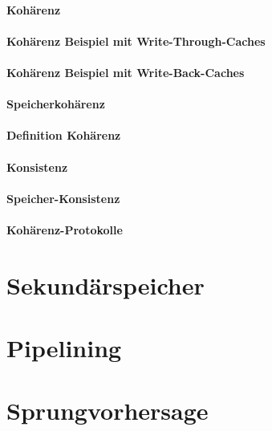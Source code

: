 \subsubsection{Kohärenz}
\subsubsection*{Kohärenz Beispiel mit Write-Through-Caches}
\subsubsection*{Kohärenz Beispiel mit Write-Back-Caches}

\subsubsection*{Speicherkohärenz}

\subsubsection*{Definition Kohärenz}

\subsubsection{Konsistenz}

\subsubsection*{Speicher-Konsistenz}

\subsubsection{Kohärenz-Protokolle}


\chapter{Sekundärspeicher}

\chapter{Pipelining}

\chapter{Sprungvorhersage}

